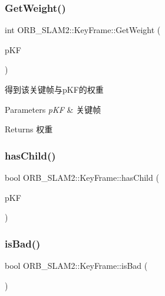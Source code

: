 \subsubsection{\texorpdfstring{Get\+Weight()}{GetWeight()}}
{\footnotesize\ttfamily int O\+R\+B\+\_\+\+S\+L\+A\+M2\+::\+Key\+Frame\+::\+Get\+Weight (\begin{DoxyParamCaption}\item[{\mbox{\hyperlink{class_o_r_b___s_l_a_m2_1_1_key_frame}{Key\+Frame}} $\ast$}]{p\+KF }\end{DoxyParamCaption})}



得到该关键帧与p\+K\+F的权重 


\begin{DoxyParams}{Parameters}
{\em p\+KF} & 关键帧 \\
\hline
\end{DoxyParams}
\begin{DoxyReturn}{Returns}
权重 
\end{DoxyReturn}
\mbox{\label{class_o_r_b___s_l_a_m2_1_1_key_frame_a2276fdbae634194e790878adebba7861}} 
\subsubsection{\texorpdfstring{has\+Child()}{hasChild()}}
{\footnotesize\ttfamily bool O\+R\+B\+\_\+\+S\+L\+A\+M2\+::\+Key\+Frame\+::has\+Child (\begin{DoxyParamCaption}\item[{\mbox{\hyperlink{class_o_r_b___s_l_a_m2_1_1_key_frame}{Key\+Frame}} $\ast$}]{p\+KF }\end{DoxyParamCaption})}

\mbox{\label{class_o_r_b___s_l_a_m2_1_1_key_frame_a95c437e42b4894a4acc9f05af61e9963}} 
\subsubsection{\texorpdfstring{is\+Bad()}{isBad()}}
{\footnotesize\ttfamily bool O\+R\+B\+\_\+\+S\+L\+A\+M2\+::\+Key\+Frame\+::is\+Bad (\begin{DoxyParamCaption}{ }\end{DoxyParamCaption})}

